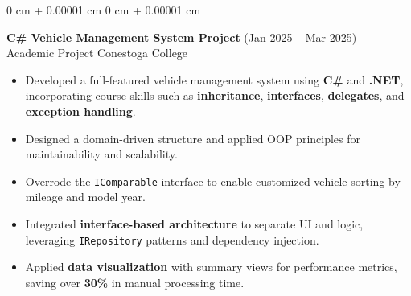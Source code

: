 \documentclass[10pt, letterpaper]{article}
\newenvironment{highlights}{
    \begin{itemize}[
        topsep=0.10 cm,
        parsep=0.10 cm,
        partopsep=0pt,
        itemsep=0pt,
        leftmargin=0 cm + 10pt
    ]
}{
    \end{itemize}
} %
\newenvironment{onecolentry}{
    \begin{adjustwidth}{
        0 cm + 0.00001 cm
    }{
        0 cm + 0.00001 cm
    }
}{
    \end{adjustwidth}
} %
\begin{document}
\begin{onecolentry}
    {\normalsize \textbf{C\# Vehicle Management System Project}} \hfill {(Jan 2025 – Mar 2025)}\\
    {Academic Project} \hfill {Conestoga College}\\
    \begin{highlights}
        \item Developed a full-featured vehicle management system using \textbf{C\#} and \textbf{.NET}, incorporating course skills such as \textbf{inheritance}, \textbf{interfaces}, \textbf{delegates}, and \textbf{exception handling}.
        \item Designed a domain-driven structure and applied OOP principles for maintainability and scalability.
        \item Overrode the \texttt{IComparable} interface to enable customized vehicle sorting by mileage and model year.
        \item Integrated \textbf{interface-based architecture} to separate UI and logic, leveraging \texttt{IRepository} patterns and dependency injection.
        \item Applied \textbf{data visualization} with summary views for performance metrics, saving over \textbf{30\%} in manual processing time.
    \end{highlights}
\end{onecolentry}
\end{document}
